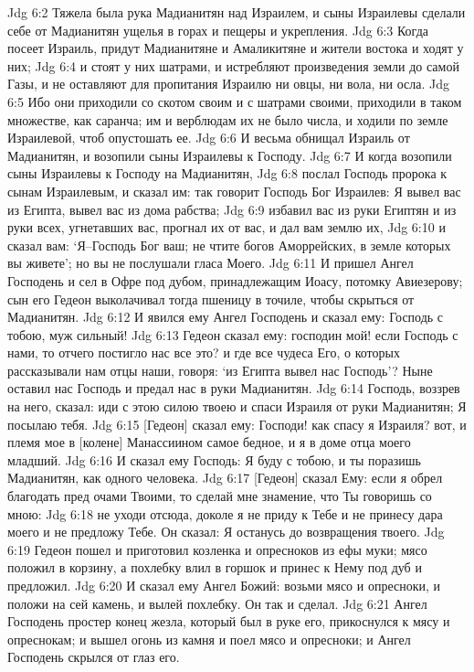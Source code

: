 Jdg 6:2  Тяжела была рука Мадианитян над Израилем, и сыны Израилевы сделали себе от Мадианитян ущелья в горах и пещеры и укрепления.
Jdg 6:3  Когда посеет Израиль, придут Мадианитяне и Амаликитяне и жители востока и ходят у них;
Jdg 6:4  и стоят у них шатрами, и истребляют произведения земли до самой Газы, и не оставляют для пропитания Израилю ни овцы, ни вола, ни осла.
Jdg 6:5  Ибо они приходили со скотом своим и с шатрами своими, приходили в таком множестве, как саранча; им и верблюдам их не было числа, и ходили по земле Израилевой, чтоб опустошать ее.
Jdg 6:6  И весьма обнищал Израиль от Мадианитян, и возопили сыны Израилевы к Господу.
Jdg 6:7  И когда возопили сыны Израилевы к Господу на Мадианитян,
Jdg 6:8  послал Господь пророка к сынам Израилевым, и сказал им: так говорит Господь Бог Израилев: Я вывел вас из Египта, вывел вас из дома рабства;
Jdg 6:9  избавил вас из руки Египтян и из руки всех, угнетавших вас, прогнал их от вас, и дал вам землю их,
Jdg 6:10  и сказал вам: `Я--Господь Бог ваш; не чтите богов Аморрейских, в земле которых вы живете'; но вы не послушали гласа Моего.
Jdg 6:11  И пришел Ангел Господень и сел в Офре под дубом, принадлежащим Иоасу, потомку Авиезерову; сын его Гедеон выколачивал тогда пшеницу в точиле, чтобы скрыться от Мадианитян.
Jdg 6:12  И явился ему Ангел Господень и сказал ему: Господь с тобою, муж сильный!
Jdg 6:13  Гедеон сказал ему: господин мой! если Господь с нами, то отчего постигло нас все это? и где все чудеса Его, о которых рассказывали нам отцы наши, говоря: `из Египта вывел нас Господь'? Ныне оставил нас Господь и предал нас в руки Мадианитян.
Jdg 6:14  Господь, воззрев на него, сказал: иди с этою силою твоею и спаси Израиля от руки Мадианитян; Я посылаю тебя.
Jdg 6:15  [Гедеон] сказал ему: Господи! как спасу я Израиля? вот, и племя мое в [колене] Манассиином самое бедное, и я в доме отца моего младший.
Jdg 6:16  И сказал ему Господь: Я буду с тобою, и ты поразишь Мадианитян, как одного человека.
Jdg 6:17  [Гедеон] сказал Ему: если я обрел благодать пред очами Твоими, то сделай мне знамение, что Ты говоришь со мною:
Jdg 6:18  не уходи отсюда, доколе я не приду к Тебе и не принесу дара моего и не предложу Тебе. Он сказал: Я останусь до возвращения твоего.
Jdg 6:19  Гедеон пошел и приготовил козленка и опресноков из ефы муки; мясо положил в корзину, а похлебку влил в горшок и принес к Нему под дуб и предложил.
Jdg 6:20  И сказал ему Ангел Божий: возьми мясо и опресноки, и положи на сей камень, и вылей похлебку. Он так и сделал.
Jdg 6:21  Ангел Господень простер конец жезла, который был в руке его, прикоснулся к мясу и опреснокам; и вышел огонь из камня и поел мясо и опресноки; и Ангел Господень скрылся от глаз его.
